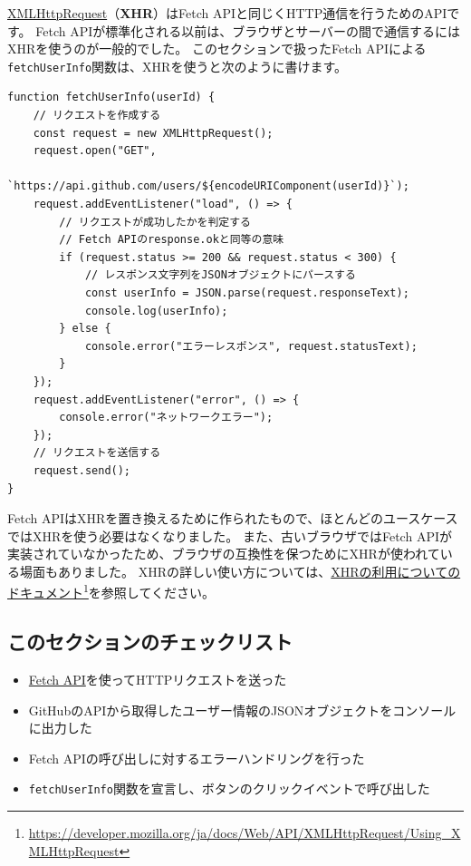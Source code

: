 \begin{tcolorbox}[title=XMLHttpRequest]\label{xhr}

\href{https://developer.mozilla.org/ja/docs/Web/API/XMLHttpRequest}{XMLHttpRequest}（\textbf{XHR}）はFetch
APIと同じくHTTP通信を行うためのAPIです。 Fetch
APIが標準化される以前は、ブラウザとサーバーの間で通信するにはXHRを使うのが一般的でした。
このセクションで扱ったFetch
APIによる\texttt{fetchUserInfo}関数は、XHRを使うと次のように書けます。

\begin{lstlisting}
function fetchUserInfo(userId) {
    // リクエストを作成する
    const request = new XMLHttpRequest();
    request.open("GET", 
            `https://api.github.com/users/${encodeURIComponent(userId)}`);
    request.addEventListener("load", () => {
        // リクエストが成功したかを判定する
        // Fetch APIのresponse.okと同等の意味
        if (request.status >= 200 && request.status < 300) {
            // レスポンス文字列をJSONオブジェクトにパースする
            const userInfo = JSON.parse(request.responseText);
            console.log(userInfo);
        } else {
            console.error("エラーレスポンス", request.statusText);
        }
    });
    request.addEventListener("error", () => {
        console.error("ネットワークエラー");
    });
    // リクエストを送信する
    request.send();
}
\end{lstlisting}

Fetch
APIはXHRを置き換えるために作られたもので、ほとんどのユースケースではXHRを使う必要はなくなりました。
また、古いブラウザではFetch
APIが実装されていなかったため、ブラウザの互換性を保つためにXHRが使われている場面もありました。
XHRの詳しい使い方については、\href{https://developer.mozilla.org/ja/docs/Web/API/XMLHttpRequest/Using_XMLHttpRequest}{XHRの利用についてのドキュメント}\footnote{\url{https://developer.mozilla.org/ja/docs/Web/API/XMLHttpRequest/Using_XMLHttpRequest}}を参照してください。
\end{tcolorbox}

\hypertarget{section-checklist}{%
\subsection{このセクションのチェックリスト}\label{section-checklist}}

\begin{itemize}
\item
  \href{https://developer.mozilla.org/ja/docs/Web/API/Fetch_API}{Fetch
  API}を使ってHTTPリクエストを送った
\item
  GitHubのAPIから取得したユーザー情報のJSONオブジェクトをコンソールに出力した
\item
  Fetch APIの呼び出しに対するエラーハンドリングを行った
\item
  \texttt{fetchUserInfo}関数を宣言し、ボタンのクリックイベントで呼び出した
\end{itemize}

